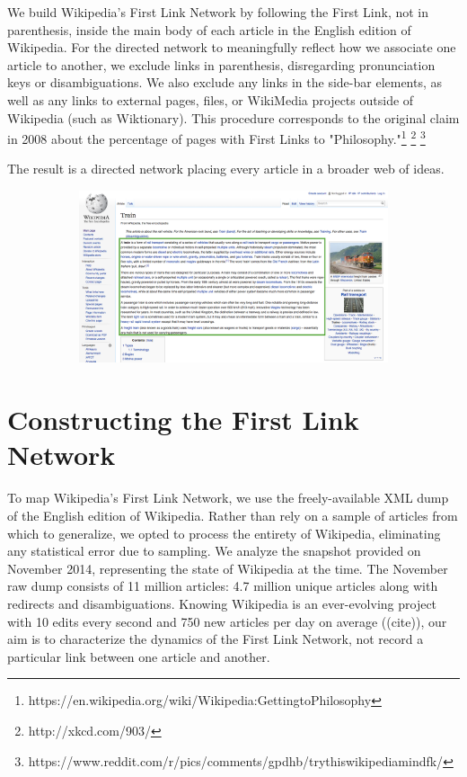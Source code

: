 \documentclass[twoside]{article}
\begin{document}
We build Wikipedia's First Link Network by following the First Link, not in parenthesis, inside the main body of each article in the English edition of Wikipedia. 
For the directed network to meaningfully reflect how we associate one article to another, we exclude links in parenthesis, 
disregarding pronunciation keys or disambiguations.
We also exclude any links in the side-bar elements, as well as any links to external pages, files, or WikiMedia 
projects outside of Wikipedia (such as Wiktionary).
This procedure corresponds to the original claim in 2008 about the percentage of pages with First Links to 
"Philosophy."\footnote{
https://en.wikipedia.org/wiki/Wikipedia:GettingtoPhilosophy
}
\footnote{
http://xkcd.com/903/
}
\footnote{
https://www.reddit.com/r/pics/comments/gpdhb/trythiswikipediamindfk/
}

The result is a directed network placing every article in a broader web of ideas.


\begin{figure}[H]
\centering
\caption{Wikipedia Train}
    \begin{subfigure}[b]{0.8\textwidth}
        \includegraphics[width=\textwidth]{graphics/wiki_train.png}    
    \end{subfigure}
\end{figure}

\section{Constructing the First Link Network}

To map Wikipedia's First Link Network, we use the freely-available XML dump of the English edition of Wikipedia. 
Rather than rely on a sample of articles from which to generalize, we opted to process the entirety of Wikipedia, 
eliminating any statistical error due to sampling.
We analyze the snapshot provided on November 2014, representing the state of Wikipedia at the time.
The November raw dump consists of 11 million articles: 4.7 million unique articles along with redirects
and disambiguations.
Knowing Wikipedia is an ever-evolving project with 10 edits every second and 750 new articles per day on average
((cite)), our aim is to characterize the dynamics of the First Link Network, not record a particular link between one
article and another.
\end{document}
